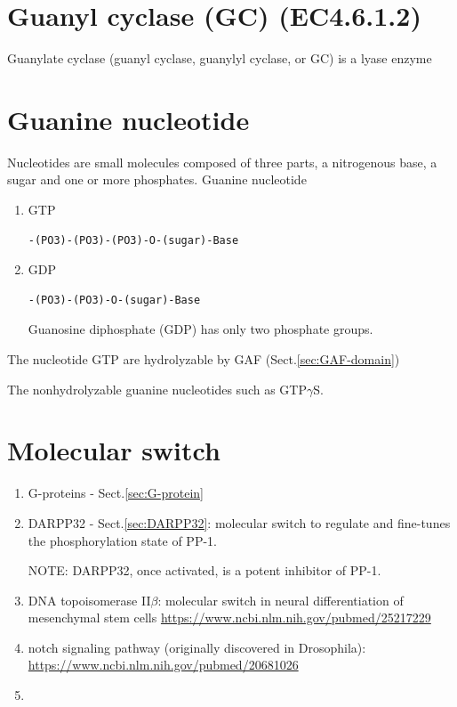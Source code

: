 \section{Guanyl cyclase (GC) (EC4.6.1.2)}
\label{sec:guanylate-cyclase}

Guanylate cyclase (guanyl cyclase, guanylyl cyclase, or GC)
is a lyase enzyme


\section{Guanine nucleotide}
\label{sec:guanine-nucleotide}

Nucleotides are small molecules composed of three parts, a nitrogenous base, a
sugar and one or more phosphates. Guanine nucleotide
\begin{enumerate}
  \item GTP

\begin{verbatim}
-(PO3)-(PO3)-(PO3)-O-(sugar)-Base
\end{verbatim}

  \item GDP

\begin{verbatim}
-(PO3)-(PO3)-O-(sugar)-Base
\end{verbatim}
Guanosine diphosphate (GDP) has only two phosphate groups.

\end{enumerate}
The nucleotide GTP are hydrolyzable by GAF (Sect.\ref{sec:GAF-domain})

The nonhydrolyzable guanine nucleotides such as GTP$\gamma$S.


\section{Molecular switch}
\label{sec:molecular-switch}


\begin{enumerate}
  \item G-proteins - Sect.\ref{sec:G-protein}
  
  \item DARPP32 - Sect.\ref{sec:DARPP32}: molecular switch to regulate and
  fine-tunes the phosphorylation state of PP-1.

NOTE: DARPP32, once activated, is a potent inhibitor of PP-1.
  
  \item DNA topoisomerase II$\beta$: molecular switch in neural differentiation
  of mesenchymal stem cells
  \url{https://www.ncbi.nlm.nih.gov/pubmed/25217229}
  
  \item notch signaling pathway (originally discovered in Drosophila): 
  \url{https://www.ncbi.nlm.nih.gov/pubmed/20681026}
  
  \item 
\end{enumerate}
